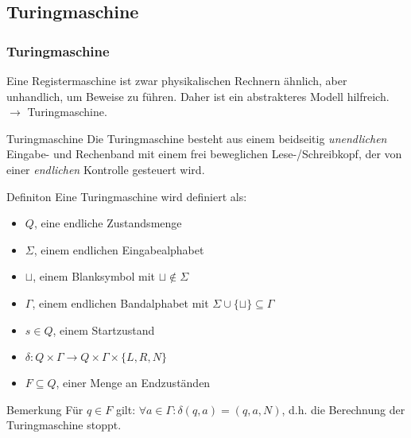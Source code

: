 \documentclass{beamer}
\begin{document}
{\subsection{Turingmaschine}
\begin{frame}
\frametitle{Turingmaschine}
Eine Registermaschine ist zwar physikalischen Rechnern ähnlich, aber unhandlich, um Beweise zu führen.
Daher ist ein abstrakteres Modell hilfreich. \\
$\rightarrow$ Turingmaschine.
\pause
\begin{block}{Turingmaschine}
Die Turingmaschine besteht aus einem beidseitig \emph{unendlichen} Eingabe- und Rechenband
mit einem frei beweglichen Lese-/Schreibkopf, der von einer \emph{endlichen} Kontrolle gesteuert wird. 
\end{block}
\end{frame}
\begin{frame}
\vspace{-1cm}
\begin{block}{Definiton}
Eine Turingmaschine wird definiert als:
 \begin{itemize}
 \item $Q$, eine endliche Zustandsmenge
 \item $\Sigma$, einem endlichen Eingabealphabet
 \item $\sqcup$, einem Blanksymbol mit $\sqcup \notin \Sigma$
 \item $\Gamma$, einem endlichen Bandalphabet mit $\Sigma \cup\{\sqcup\} \subseteq \Gamma$
 \item $s \in Q$, einem Startzustand
 \item $\delta: Q\times\Gamma \rightarrow Q\times\Gamma\times\{L, R, N\}$
 \item $F \subseteq Q$, einer Menge an Endzuständen
 \end{itemize}
\end{block}
\begin{block}{Bemerkung}
 Für $q\in F$ gilt: $\forall a \in \Gamma: \delta(q, a) = (q, a, N)$, d.h. die Berechnung der Turingmaschine stoppt.
\end{block}
\end{frame}

}
\end{document}
